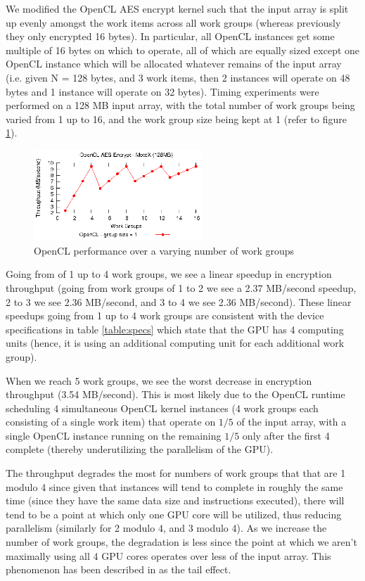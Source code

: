\documentclass[conference,10pt]{IEEEtran}
\begin{document}
We modified the OpenCL AES encrypt kernel such that the input array is split up evenly amongst the 
work items across all work groups (whereas previously they only encrypted 16 bytes). In particular, 
all OpenCL instances get some multiple of 16 bytes on which to operate, all of which are equally 
sized except one OpenCL instance which will be allocated whatever remains of the input array (i.e.  
given N = 128 bytes, and 3 work items, then 2 instances will operate on 48 bytes and 1 instance will 
operate on 32 bytes). Timing experiments were performed on a 128 MB input array, with the total 
number of work groups being varied from 1 up to 16, and the work group size being kept at 1 (refer 
to figure \ref{fig:num_work_groups}).

\begin{figure}[!t]
\centering
\includegraphics[width=2.5in]{../final/motox/4.2/sample_opencl_aes_global_worksize.128MB.16_max_global_worksize.again.report.eps}
\caption{OpenCL performance over a varying number of work groups}
\label{fig:num_work_groups}
\end{figure}

Going from of 1 up to 4 work groups, we see a linear speedup in encryption throughput (going from 
work groups of 1 to 2 we see a 2.37 MB/second speedup, 2 to 3 we see 2.36 MB/second, and 3 to 4 we 
see 2.36 MB/second). These linear speedups going from 1 up to 4 work groups are consistent with the 
device specifications in table \ref{table:specs} which state that the GPU has 4 computing units 
(hence, it is using an additional computing unit for each additional work group).

When we reach 5 work groups, we see the worst decrease in encryption throughput (3.54 MB/second).  
This is most likely due to the OpenCL runtime scheduling 4 simultaneous OpenCL kernel instances (4 
work groups each consisting of a single work item) that operate on $1/5$ of the input array, with a 
single OpenCL instance running on the remaining $1/5$ only after the first 4 complete (thereby 
underutilizing the parallelism of the GPU).

The throughput degrades the most for numbers of work groups that that are 1 modulo 4 since given 
that instances will tend to complete in roughly the same time (since they have the same data size 
and instructions executed), there will tend to be a point at which only one GPU core will be 
utilized, thus reducing parallelism (similarly for 2 modulo 4, and 3 modulo 4). As we increase the 
number of work groups, the degradation is less since the point at which we aren't maximally using 
all 4 GPU cores operates over less of the input array.  This phenomenon has been described in 
\cite{gpu_opt} as the tail effect.
\end{document}

